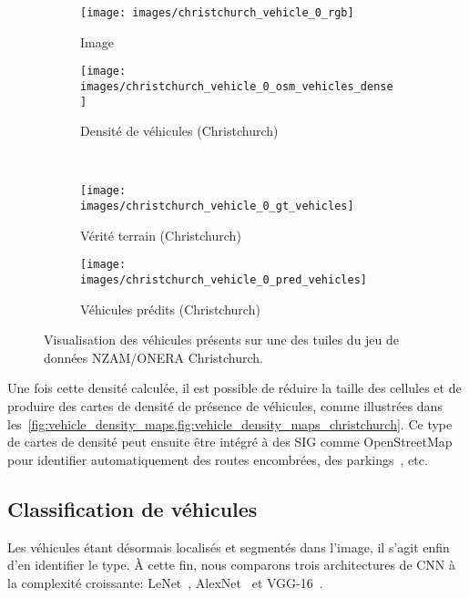\begin{figure}[h]
  \centering
  \begin{subfigure}{0.35\textwidth}
    \texttt{[image: images/christchurch\_vehicle\_0\_rgb]}
    \caption{Image }
  \end{subfigure}
  \hspace{0.1\textwidth}
  \begin{subfigure}{0.35\textwidth}
    \texttt{[image: images/christchurch\_vehicle\_0\_osm\_vehicles\_dense]}
    \caption{Densité de véhicules (Christchurch)}
  \end{subfigure}\\
  \begin{subfigure}{0.35\textwidth}
    \texttt{[image: images/christchurch\_vehicle\_0\_gt\_vehicles]}
    \caption{Vérité terrain (Christchurch)}
  \end{subfigure}
  \hspace{0.1\textwidth}
  \begin{subfigure}{0.35\textwidth}
    \texttt{[image: images/christchurch\_vehicle\_0\_pred\_vehicles]}
    \caption{Véhicules prédits (Christchurch)}
  \end{subfigure}
  \caption{Visualisation des véhicules présents sur une des tuiles du jeu de données NZAM/ONERA Christchurch.}
  \label{fig:vehicle_density_maps_christchurch}
\end{figure}

Une fois cette densité calculée, il est possible de réduire la taille des cellules et de produire des cartes de densité de présence de véhicules, comme illustrées dans les~\cref{fig:vehicle_density_maps,fig:vehicle_density_maps_christchurch}. Ce type de cartes de densité peut ensuite être intégré à des \gls{SIG} comme OpenStreetMap pour identifier automatiquement des routes encombrées, des parkings~\cite{kamenetsky_aerial_2015}, etc.

\subsection{Classification de véhicules}

Les véhicules étant désormais localisés et segmentés dans l'image, il s'agit enfin d'en identifier le type. À cette fin, nous comparons trois architectures de \gls{CNN} à la complexité croissante: LeNet~\cite{lecun_gradient-based_1998}, AlexNet~\cite{krizhevsky_imagenet_2012} et VGG-16~\cite{simonyan_very_2015}.

